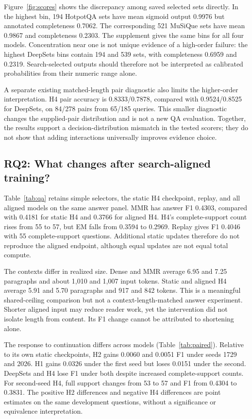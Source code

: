 \documentclass[preprint,12pt]{elsarticle}
\begin{document}
Figure~\ref{fig:scores} shows the discrepancy among saved selected sets directly. In the highest bin, 194 HotpotQA sets have mean sigmoid output 0.9976 but annotated completeness 0.7062. The corresponding 521 MuSiQue sets have mean 0.9867 and completeness 0.2303. The supplement gives the same bins for all four models. Concentration near one is not unique evidence of a high-order failure: the highest DeepSets bins contain 194 and 539 sets, with completeness 0.6959 and 0.2319. Search-selected outputs should therefore not be interpreted as calibrated probabilities from their numeric range alone.

A separate existing matched-length pair diagnostic also limits the higher-order interpretation. H4 pair accuracy is 0.8333/0.7878, compared with 0.9524/0.8525 for DeepSets, on 84/278 pairs from 65/185 queries. This smaller diagnostic changes the supplied-pair distribution and is not a new QA evaluation. Together, the results support a decision-distribution mismatch in the tested scorers; they do not show that adding interactions universally improves evidence choice.

\subsection{RQ2: What changes after search-aligned training?}

Table~\ref{tab:qa} retains simple selectors, the static H4 checkpoint, replay, and all aligned models on the same answer panel. MMR has answer F1 0.4303, compared with 0.4181 for static H4 and 0.3766 for aligned H4. H4's complete-support count rises from 55 to 57, but EM falls from 0.3594 to 0.2969. Replay gives F1 0.4046 with 55 complete-support questions. Additional static updates therefore do not reproduce the aligned endpoint, although equal updates are not equal total compute.

The contexts differ in realized size. Dense and MMR average 6.95 and 7.25 paragraphs and about 1,010 and 1,007 input tokens. Static and aligned H4 average 5.91 and 5.70 paragraphs and 917 and 842 tokens. This is a meaningful shared-ceiling comparison but not a context-length-matched answer experiment. Shorter aligned input may reduce reader work, yet the intervention did not isolate length from content. Its F1 change cannot be attributed to shortening alone.


The response to continuation differs across models (Table~\ref{tab:paired}). Relative to its own static checkpoints, H2 gains 0.0060 and 0.0051 F1 under seeds 1729 and 2026. H1 gains 0.0326 under the first seed but loses 0.0151 under the second. DeepSets and H4 lose F1 under both despite increased complete-support counts. For second-seed H4, full support changes from 53 to 57 and F1 from 0.4304 to 0.3831. The positive H2 differences and negative H4 differences are point estimates on the same development questions, without a significance or equivalence interpretation.
\end{document}
